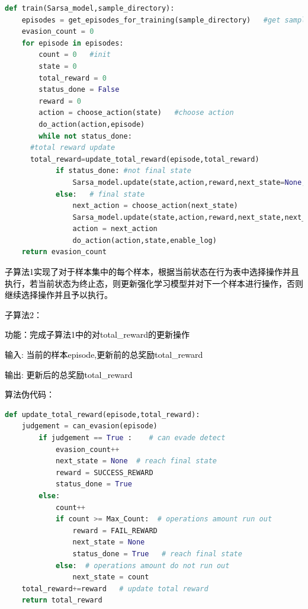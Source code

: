 \begin{lstlisting}[language=Python, caption={code for sub alogrithm 1}, label={lst:pythonfile2}]
def train(Sarsa_model,sample_directory):  
    episodes = get_episodes_for_training(sample_directory)   #get samples
    evasion_count = 0   
    for episode in episodes:  
        count = 0   #init
        state = 0  
        total_reward = 0   
        status_done = False   
        reward = 0   
        action = choose_action(state)   #choose action
        do_action(action,episode)   
        while not status_done:
      #total reward update
      total_reward=update_total_reward(episode,total_reward)
            if status_done: #not final state
                Sarsa_model.update(state,action,reward,next_state=None,next_action=None)   
            else:   # final state
                next_action = choose_action(next_state)   
                Sarsa_model.update(state,action,reward,next_state,next_action)   
                action = next_action   
                do_action(action,state,enable_log)   
    return evasion_count
\end{lstlisting}

\textcolor{black}{子算法1实现了对于样本集中的每个样本，根据当前状态在行为表中选择操作并且执行，若当前状态为终止态，则更新强化学习模型并对下一个样本进行操作，否则继续选择操作并且予以执行。}

\textcolor{black}{子算法2：}

\textcolor{black}{功能：完成子算法1中的对total\_reward的更新操作}

\textcolor{black}{输入: 当前的样本episode,更新前的总奖励total\_reward}

\textcolor{black}{输出: 更新后的总奖励total\_reward}

\textcolor{black}{算法伪代码：}

\begin{lstlisting}[language=Python, caption={code for sub alogrithm 2}, label={lst:pythonfile3}]
def update_total_reward(episode,total_reward):  
    judgement = can_evasion(episode)   
        if judgement == True :    # can evade detect
            evasion_count++   
            next_state = None  # reach final state
            reward = SUCCESS_REWARD   
            status_done = True   
        else:  
            count++   
            if count >= Max_Count:  # operations amount run out
                reward = FAIL_REWARD   
                next_state = None   
                status_done = True   # reach final state
            else:  # operations amount do not run out
                next_state = count   
    total_reward+=reward   # update total reward
    return total_reward  
\end{lstlisting}

